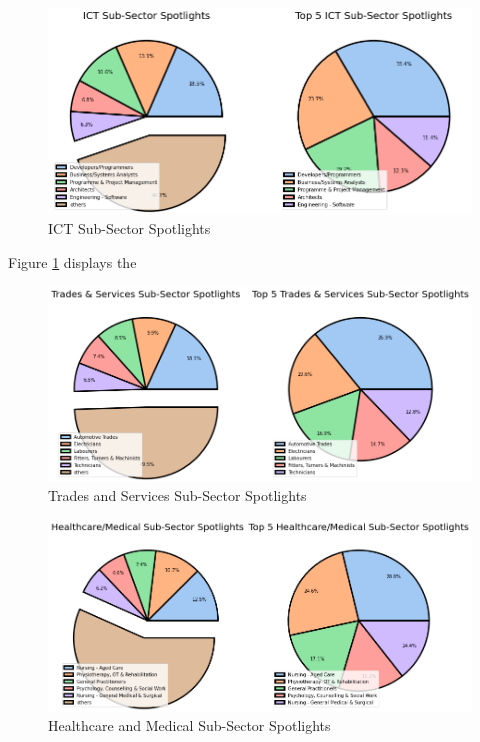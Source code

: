 \documentclass[twoside, 12pt, a4paper]{article}
\begin{document}
\begin{figure}[h]
	\centering
	\includegraphics[scale = 0.50]{ICTspotlights.png}
	\caption{ICT Sub-Sector Spotlights}
	\label{fig:ICTspotlight}
\end{figure}

Figure \ref{fig:ICTspotlight} displays the 


\begin{figure}[h]
	\centering
	\includegraphics[scale = 0.50]{Tradespotlights.png}
	\caption{Trades and Services Sub-Sector Spotlights}
	\label{fig:Tradespotlight}
\end{figure}

\begin{figure}[h]
	\centering
	\includegraphics[scale = 0.50]{Healthspotlight.png}
	\caption{Healthcare and Medical Sub-Sector Spotlights}
	\label{fig:Healtspotlight}
\end{figure}
\end{document}
